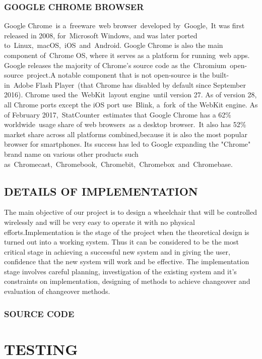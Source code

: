 \documentclass[11pt]{report} %
\begin{document}
\subsection{GOOGLE CHROME BROWSER}
\label{subsec:GOOGLE CHROME BROWSER}
Google Chrome is a freeware web browser developed by Google, It was first released in 2008, for Microsoft Windows, and was later ported to Linux, macOS, iOS and Android. Google Chrome is also the main component of Chrome OS, where it serves as a platform for running web apps.
Google releases the majority of Chrome's source code as the Chromium open-source project.A notable component that is not open-source is the built-in Adobe Flash Player (that Chrome has disabled by default since September 2016). Chrome used the WebKit layout engine until version 27. As of version 28, all Chrome ports except the iOS port use Blink, a fork of the WebKit engine.
As of February 2017, StatCounter estimates that Google Chrome has a 62\% worldwide usage share of web browsers as a desktop browser. It also has 52\% market share across all platforms combined,because it is also the most popular browser for smartphones. Its success has led to Google expanding the "Chrome" brand name on various other products such as Chromecast, Chromebook, Chromebit, Chromebox and Chromebase.


\section{DETAILS OF IMPLEMENTATION}
\label{sec:DETAILS OF IMPLEMENTATION}

The main objective of our project is to design a wheelchair that will be controlled wirelessly and will be very easy to operate it with no physical efforts.Implementation is the stage of the project when the theoretical design is turned out into a working system. Thus it can be considered to be the most critical stage in achieving a successful new system and in giving the user, confidence that the new system will work and be effective.
The implementation stage involves careful planning, investigation of the existing system and it's constraints on implementation, designing of methods to achieve changeover and evaluation of changeover methods.

\subsection{SOURCE CODE}
\label{sec:SOURCE CODE}

\chapter{TESTING}
\label{cha:TESTING}
\end{document}
